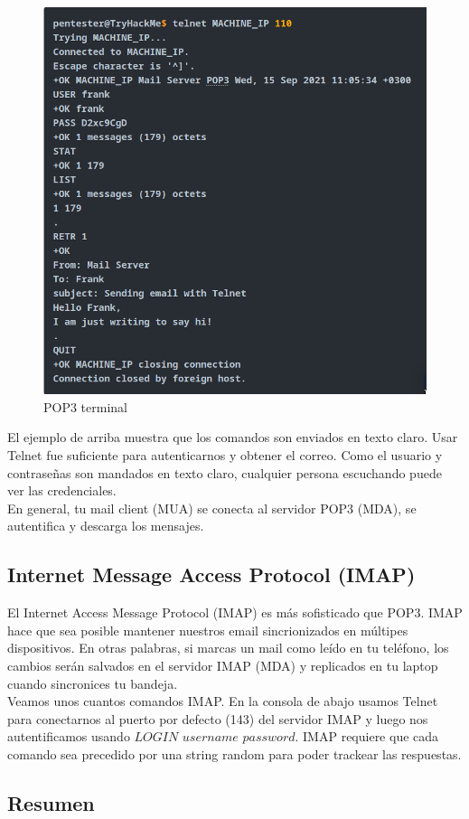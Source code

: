 \documentclass[12pt]{report}
\begin{document}
\begin{figure}[h]
\centering
\includegraphics[width=1\textwidth]{POP3-Terminal.jpg}
\caption{POP3 terminal}
\end{figure}

El ejemplo de arriba muestra que los comandos son enviados en texto claro. Usar 
Telnet fue suficiente para autenticarnos y obtener el correo. Como el usuario y contraseñas
son mandados en texto claro, cualquier persona escuchando puede ver las credenciales.\\

En general, tu mail client (MUA) se conecta al servidor POP3 (MDA), se autentifica y
descarga los mensajes.\\

\subsection{Internet Message Access Protocol (IMAP)}
El Internet Access Message Protocol (IMAP) es más sofisticado que POP3. IMAP hace que sea 
posible mantener nuestros email sincrionizados en múltipes dispositivos. En otras 
palabras, si marcas un mail como leído en tu teléfono, los cambios serán salvados
en el servidor IMAP (MDA) y replicados en tu laptop cuando sincronices tu bandeja.\\

Veamos unos cuantos comandos IMAP. En la consola de abajo usamos Telnet para conectarnos
al puerto por defecto (143) del servidor IMAP y luego nos autentificamos usando 
$\textit{LOGIN username password}$. IMAP requiere que cada comando sea precedido 
por una string random para poder trackear las respuestas. 

\subsection{Resumen}
\end{document}
